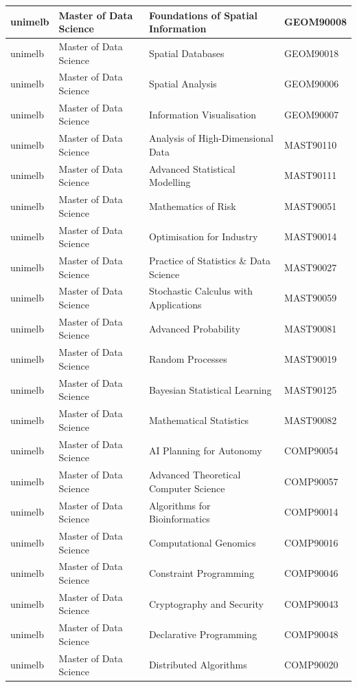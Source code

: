 \documentclass[
  letterpaper,
  DIV=11,
  numbers=noendperiod]{scrreport}
\begin{document}
\begin{table}
\begin{tabular}{l|l|l|l}
\hline
unimelb & Master of Data Science & Foundations of Spatial Information & GEOM90008\\
\hline
unimelb & Master of Data Science & Spatial Databases & GEOM90018\\
\hline
unimelb & Master of Data Science & Spatial Analysis & GEOM90006\\
\hline
unimelb & Master of Data Science & Information Visualisation & GEOM90007\\
\hline
unimelb & Master of Data Science & Analysis of High-Dimensional Data & MAST90110\\
\hline
unimelb & Master of Data Science & Advanced Statistical Modelling & MAST90111\\
\hline
unimelb & Master of Data Science & Mathematics of Risk & MAST90051\\
\hline
unimelb & Master of Data Science & Optimisation for Industry & MAST90014\\
\hline
unimelb & Master of Data Science & Practice of Statistics \& Data Science & MAST90027\\
\hline
unimelb & Master of Data Science & Stochastic Calculus with Applications & MAST90059\\
\hline
unimelb & Master of Data Science & Advanced Probability & MAST90081\\
\hline
unimelb & Master of Data Science & Random Processes & MAST90019\\
\hline
unimelb & Master of Data Science & Bayesian Statistical Learning & MAST90125\\
\hline
unimelb & Master of Data Science & Mathematical Statistics & MAST90082\\
\hline
unimelb & Master of Data Science & AI Planning for Autonomy & COMP90054\\
\hline
unimelb & Master of Data Science & Advanced Theoretical Computer Science & COMP90057\\
\hline
unimelb & Master of Data Science & Algorithms for Bioinformatics & COMP90014\\
\hline
unimelb & Master of Data Science & Computational Genomics & COMP90016\\
\hline
unimelb & Master of Data Science & Constraint Programming & COMP90046\\
\hline
unimelb & Master of Data Science & Cryptography and Security & COMP90043\\
\hline
unimelb & Master of Data Science & Declarative Programming & COMP90048\\
\hline
unimelb & Master of Data Science & Distributed Algorithms & COMP90020\\

\end{tabular}
\end{table}
\end{document}

